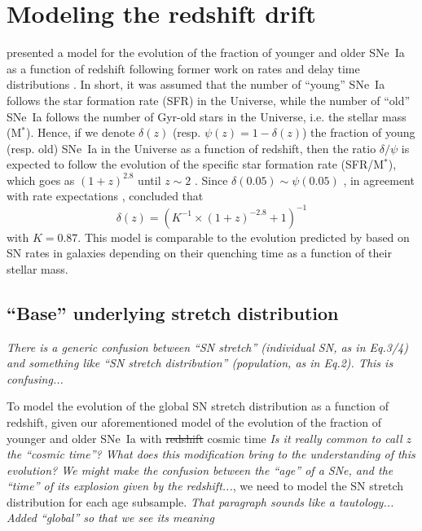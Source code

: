 \documentclass[]{aa} %
\newcommand{\nn}[1]{{\textcolor[rgb]{0.25, 0.50, 0}{#1}}}
\newcommand{\yc}[1]{{\textcolor{BrickRed}{#1}}}
\begin{document}
\section{Modeling the redshift drift}\label{sec:modeling}

\cite{rigault2018} presented a model for the evolution of the fraction of
younger and older SNe~Ia as a function of redshift following former work on
rates and delay time distributions \citep[e.g.,][]{mannucci2005,
scannapieco2005, sullivan2006, aubourg2008, childress2014, maozmannucci2014}.
In short, it was assumed that the number of ``young'' SNe~Ia follows the star
formation \nn{rate} (SFR) in the Universe, while the number of ``old'' SNe~Ia
follows the number of Gyr-old stars in the Universe, i.e. the stellar mass
(M$^*$). Hence, if we denote $\delta(z)$ (resp. $\psi(z) = 1-\delta(z)$) the
fraction of young (resp. old) SNe~Ia in the Universe as a function of redshift,
then the ratio $\delta/\psi$ is expected to follow the evolution of the specific
star formation rate (SFR/M$^*$), which goes as $(1+z)^{2.8}$ until $z\sim2$
\citep[e.g.,][]{tasca2015}. Since $\delta(0.05) \sim \psi(0.05)$
\citep{rigault2013,rigault2018,wiseman2020}, in agreement with rate expectations
\citep{mannucci2006,rodney2014}, \cite{rigault2018} concluded that
\begin{equation}
    \label{eq:delta}
    \delta(z) = \left( K^{-1} \times (1+z)^{-2.8} +1 \right)^{-1}
\end{equation}
with $K=0.87$. This model is comparable to the evolution predicted by
\cite{childress2014} based on SN rates in galaxies depending on their quenching
time as a function of their stellar mass.

\subsection{``Base'' underlying stretch distribution}\label{sec:basemodel}

\yc{\textit{There is a generic confusion between ``SN stretch'' (individual SN,
as in Eq.3/4) and something like ``SN stretch distribution'' (population, as in
Eq.2).  This is confusing...}}

To model the evolution of the \nn{global} SN stretch distribution as a function
of redshift, given our aforementioned model of the evolution of the fraction of
younger and older SNe~Ia with \yc{\sout{redshift} cosmic time} \nn{\textit{Is it
        really common to call $z$ the ``cosmic time''? What does this
modification bring to the understanding of this evolution? We might make the
confusion between the ``age'' of a SNe, and the ``time'' of its explosion given
by the redshift...}}, we need to model the SN stretch distribution for each age
subsample. \yc{\textit{That paragraph sounds like a tautology...}}
\nn{\textit{Added ``global'' so that we see its meaning}}
\end{document}
